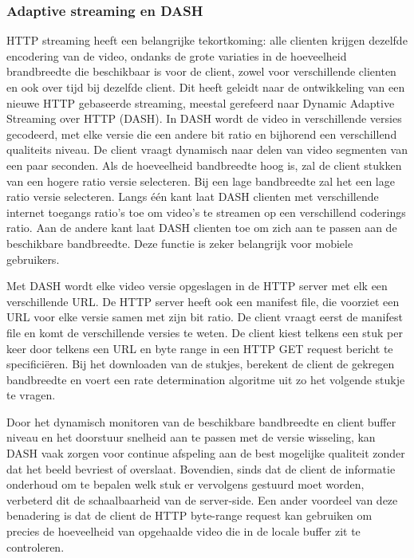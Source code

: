 \clearpage

\subsubsection{Adaptive streaming en DASH}

HTTP streaming heeft een belangrijke tekortkoming: alle clienten krijgen dezelfde encodering van de video, ondanks de grote variaties in de hoeveelheid brandbreedte die beschikbaar is voor de client, zowel voor verschillende clienten en ook over tijd bij dezelfde client. Dit heeft geleidt naar de ontwikkeling van een nieuwe HTTP gebaseerde streaming, meestal gerefeerd naar Dynamic Adaptive Streaming over HTTP (DASH). In DASH wordt de video in verschillende  versies gecodeerd, met elke versie die een andere bit ratio en bijhorend een verschillend qualiteits niveau. De client vraagt dynamisch naar delen van video segmenten van een paar seconden. Als de hoeveelheid bandbreedte hoog is, zal de client stukken van een hogere ratio versie selecteren. Bij een lage bandbreedte zal het een lage ratio versie selecteren.
Langs één kant laat DASH clienten met verschillende internet toegangs ratio’s toe om video’s te streamen op een verschillend coderings ratio. Aan de andere kant laat DASH clienten toe om zich aan te passen aan de beschikbare bandbreedte. Deze functie is zeker belangrijk voor mobiele gebruikers.

Met DASH wordt elke video versie opgeslagen in de HTTP server met elk een verschillende URL. De HTTP server heeft ook een manifest file, die voorziet een URL voor elke versie samen met zijn bit ratio. De client vraagt eerst de manifest file en komt de verschillende versies te weten. De client kiest telkens een stuk per keer door telkens een URL en byte range in een HTTP GET request bericht te specificiëren. Bij het downloaden van de stukjes, berekent de client de gekregen bandbreedte en voert een rate determination algoritme uit zo het volgende stukje te vragen.

Door het dynamisch monitoren van de beschikbare bandbreedte en client buffer niveau en het doorstuur snelheid aan te passen met de versie wisseling, kan DASH vaak zorgen voor continue afspeling aan de best mogelijke qualiteit zonder dat het beeld bevriest of overslaat. Bovendien, sinds dat de client de informatie onderhoud om te bepalen welk stuk er vervolgens gestuurd moet worden, verbeterd dit de schaalbaarheid van de server-side. Een ander voordeel van deze benadering is dat de client de HTTP byte-range request kan gebruiken om precies de hoeveelheid van opgehaalde video die in de locale buffer zit te controleren.

